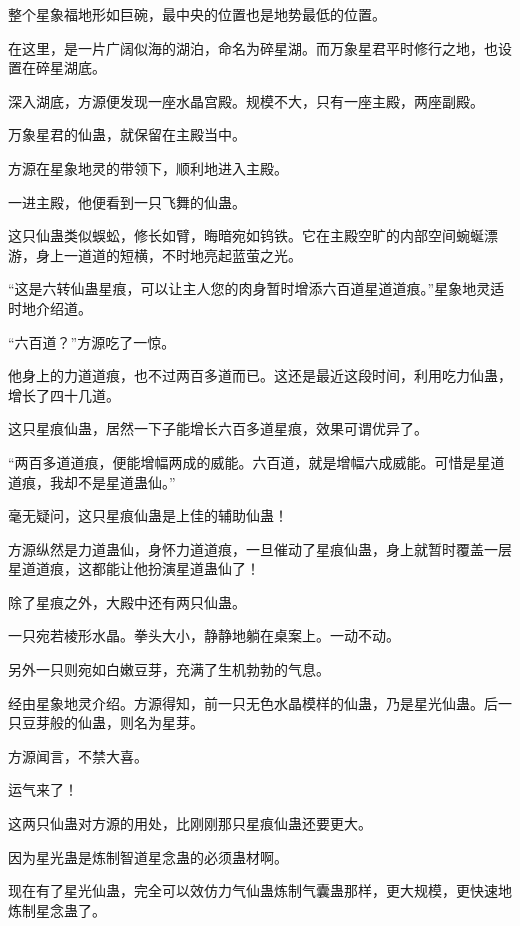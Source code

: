 
\begin{this_body}



整个星象福地形如巨碗，最中央的位置也是地势最低的位置。

在这里，是一片广阔似海的湖泊，命名为碎星湖。而万象星君平时修行之地，也设置在碎星湖底。

深入湖底，方源便发现一座水晶宫殿。规模不大，只有一座主殿，两座副殿。

万象星君的仙蛊，就保留在主殿当中。

方源在星象地灵的带领下，顺利地进入主殿。

一进主殿，他便看到一只飞舞的仙蛊。

这只仙蛊类似蜈蚣，修长如臂，晦暗宛如钨铁。它在主殿空旷的内部空间蜿蜒漂游，身上一道道的短横，不时地亮起蓝萤之光。

“这是六转仙蛊星痕，可以让主人您的肉身暂时增添六百道星道道痕。”星象地灵适时地介绍道。

“六百道？”方源吃了一惊。

他身上的力道道痕，也不过两百多道而已。这还是最近这段时间，利用吃力仙蛊，增长了四十几道。

这只星痕仙蛊，居然一下子能增长六百多道星痕，效果可谓优异了。

“两百多道道痕，便能增幅两成的威能。六百道，就是增幅六成威能。可惜是星道道痕，我却不是星道蛊仙。”

毫无疑问，这只星痕仙蛊是上佳的辅助仙蛊！

方源纵然是力道蛊仙，身怀力道道痕，一旦催动了星痕仙蛊，身上就暂时覆盖一层星道道痕，这都能让他扮演星道蛊仙了！

除了星痕之外，大殿中还有两只仙蛊。

一只宛若棱形水晶。拳头大小，静静地躺在桌案上。一动不动。

另外一只则宛如白嫩豆芽，充满了生机勃勃的气息。

经由星象地灵介绍。方源得知，前一只无色水晶模样的仙蛊，乃是星光仙蛊。后一只豆芽般的仙蛊，则名为星芽。

方源闻言，不禁大喜。

运气来了！

这两只仙蛊对方源的用处，比刚刚那只星痕仙蛊还要更大。

因为星光蛊是炼制智道星念蛊的必须蛊材啊。

现在有了星光仙蛊，完全可以效仿力气仙蛊炼制气囊蛊那样，更大规模，更快速地炼制星念蛊了。


\end{this_body}
